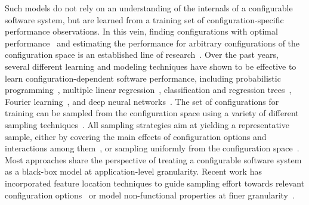 Such models do not rely on an understanding of the internals of a configurable software system, but are learned from a training set of configuration-specific performance observations. In this vein, finding configurations with optimal performance~\cite{chen_mmo_2021,nairUsingBadLearners2017,nairFlash18,ohFindingNearoptimalConfigurations2017} and estimating the performance for arbitrary configurations of the configuration space is an established line of research~\cite{dorn2020,siegmundPerformanceinfluenceModelsHighly2015,haDeepPerf2019,perfAL,guoVariabilityawarePerformancePrediction2013,sarkarCostEfficientSamplingPerformance,guo_2018_data,fourier_learning_2015,perLasso,chen_hinnperf_2022}.
Over the past years, several different learning and modeling techniques have shown to be effective to learn configuration-dependent software performance,  including probabilistic programming~\cite{dorn2020}, multiple linear regression~\cite{siegmundPerformanceinfluenceModelsHighly2015}, classification and regression trees~\cite{guoVariabilityawarePerformancePrediction2013,sarkarCostEfficientSamplingPerformance,guo_2018_data}, Fourier learning~\cite{fourier_learning_2015,perLasso}, and deep neural networks~\cite{haDeepPerf2019,perfAL,chen_hinnperf_2022}.
The set of configurations for training can be sampled from the configuration space using a variety of different sampling techniques~\cite{kaltenecker_interplay_2020,medeiros_comparison_2016}. All sampling strategies aim at yielding a representative sample, either by covering the main effects of configuration options and interactions among them~\cite{siegmundPredictingPerformanceAutomated2012}, or sampling uniformly from the configuration space~\cite{ohFindingNearoptimalConfigurations2017,kaltenecker_distance-based_2019}.
Most approaches share the perspective of treating a configurable software system as a black-box model at application-level granularity. Recent work has incorporated feature location techniques to guide sampling effort towards relevant configuration options~\cite{velez_2020_configcrusher_jase,velez_comprex_2021} or model non-functional properties at finer granularity~\cite{weber_white_2021,han_confprof_2021}.

